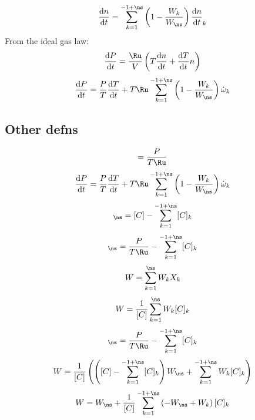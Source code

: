 \documentclass[a4paper,10pt]{article}
\begin{document}
\begin{dmath} \frac{\text{d} n }{\text{d} t } = \sum_{k=1}^{-1 + \ns} \left(1 - \frac{W_{k}}{W_{\ns}}\right) \frac{\text{d} n }{\text{d} t }_{k}\end{dmath} 
From the ideal gas law:
\begin{dmath} \frac{\text{d} P }{\text{d} t } = \frac{\Ru}{V} \left(T \frac{\text{d} n }{\text{d} t } + \frac{\text{d} T }{\text{d} t } n\right)\end{dmath} 
\begin{dmath} \frac{\text{d} P }{\text{d} t } = \frac{P}{T} \frac{\text{d} T }{\text{d} t } + T \Ru \sum_{k=1}^{-1 + \ns} \left(1 - \frac{W_{k}}{W_{\ns}}\right) \dot{\omega}_{k}\end{dmath} 
\subsection{Other defns}
\begin{dmath} [C] = \frac{P}{T \Ru}\end{dmath} 
\begin{dmath} \frac{\text{d} P }{\text{d} t } = \frac{P}{T} \frac{\text{d} T }{\text{d} t } + T \Ru \sum_{k=1}^{-1 + \ns} \left(1 - \frac{W_{k}}{W_{\ns}}\right) \dot{\omega}_{k}\end{dmath} 
\begin{dmath} [C]_{\ns} = [C] - \sum_{k=1}^{-1 + \ns} [C]_{k}\end{dmath} 
\begin{dmath} [C]_{\ns} = \frac{P}{T \Ru} - \sum_{k=1}^{-1 + \ns} [C]_{k}\end{dmath} 
\begin{dmath} W = \sum_{k=1}^{\ns} W_{k} X_{k}\end{dmath} 
\begin{dmath} W = \frac{1}{[C]} \sum_{k=1}^{\ns} W_{k} [C]_{k}\end{dmath} 
\begin{dmath} [C]_{\ns} = \frac{P}{T \Ru} - \sum_{k=1}^{-1 + \ns} [C]_{k}\end{dmath} 
\begin{dmath} W = \frac{1}{[C]} \left(\left([C] - \sum_{k=1}^{-1 + \ns} [C]_{k}\right) W_{\ns} + \sum_{k=1}^{-1 + \ns} W_{k} [C]_{k}\right)\end{dmath} 
\begin{dmath} W = W_{\ns} + \frac{1}{[C]} \sum_{k=1}^{-1 + \ns} \left(- W_{\ns} + W_{k}\right) [C]_{k}\end{dmath} 
\end{document}
